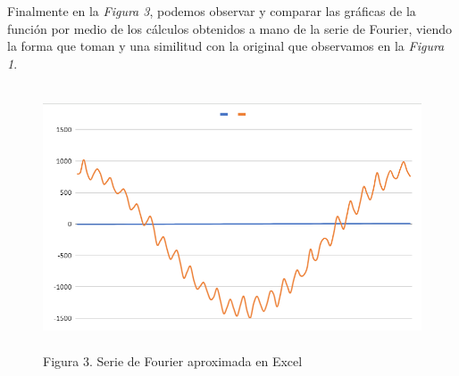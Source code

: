 Finalmente en la \emph{Figura 3}, podemos observar y comparar las gráficas de la función por medio de los cálculos obtenidos a mano de la serie de Fourier, viendo la forma que toman y una similitud con la original que observamos en la \emph{Figura 1}.

\begin{figure}[H]
	\centering
	\includegraphics[width=5.10573in,height=3.08055in]{media/image16.png}
	\caption{Figura 3. Serie de Fourier aproximada en Excel}
\end{figure}
